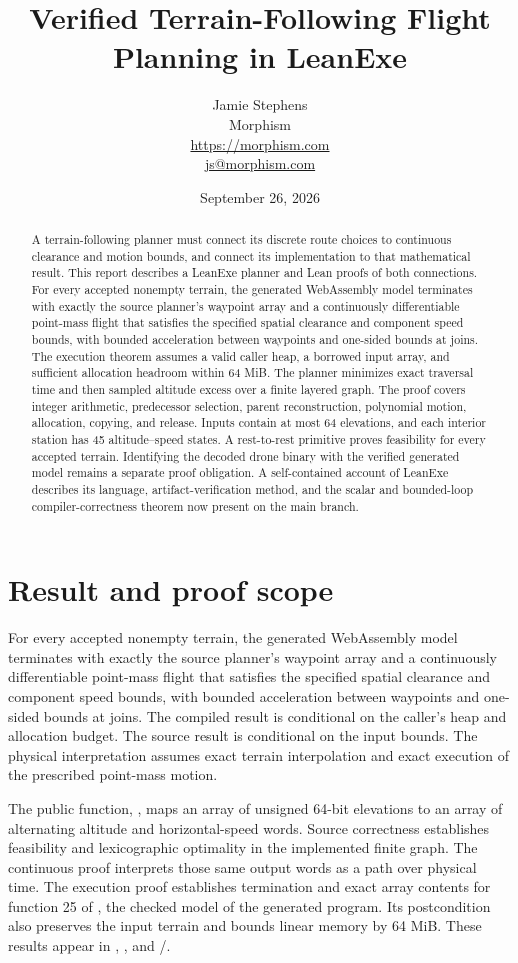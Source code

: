 \documentclass[11pt]{article}
\title{Verified Terrain-Following Flight Planning in LeanExe}
\author{Jamie Stephens\\Morphism\\\url{https://morphism.com}\\\href{mailto:js@morphism.com}{js@morphism.com}}
\date{September 26, 2026}
\begin{document}
\maketitle
\begin{abstract}
A terrain-following planner must connect its discrete route choices to continuous clearance and motion bounds, and connect its implementation to that mathematical result.  This report describes a LeanExe planner and Lean proofs of both connections.  For every accepted nonempty terrain, the generated WebAssembly model terminates with exactly the source planner's waypoint array and a continuously differentiable point-mass flight that satisfies the specified spatial clearance and component speed bounds, with bounded acceleration between waypoints and one-sided bounds at joins.  The execution theorem assumes a valid caller heap, a borrowed input array, and sufficient allocation headroom within 64 MiB.  The planner minimizes exact traversal time and then sampled altitude excess over a finite layered graph.  The proof covers integer arithmetic, predecessor selection, parent reconstruction, polynomial motion, allocation, copying, and release.  Inputs contain at most 64 elevations, and each interior station has 45 altitude--speed states.  A rest-to-rest primitive proves feasibility for every accepted terrain.  Identifying the decoded drone binary with the verified generated model remains a separate proof obligation.  A self-contained account of LeanExe describes its language, artifact-verification method, and the scalar and bounded-loop compiler-correctness theorem now present on the main branch.
\end{abstract}

\section{Result and proof scope}

For every accepted nonempty terrain, the generated WebAssembly model terminates with exactly the source planner's waypoint array and a continuously differentiable point-mass flight that satisfies the specified spatial clearance and component speed bounds, with bounded acceleration between waypoints and one-sided bounds at joins.  The compiled result is conditional on the caller's heap and allocation budget.  The source result is conditional on the input bounds.  The physical interpretation assumes exact terrain interpolation and exact execution of the prescribed point-mass motion.

The public function, , maps an array of unsigned 64-bit elevations to an array of alternating altitude and horizontal-speed words.  Source correctness establishes feasibility and lexicographic optimality in the implemented finite graph.  The continuous proof interprets those same output words as a path over physical time.  The execution proof establishes termination and exact array contents for function 25 of , the checked model of the generated program.  Its postcondition also preserves the input terrain and bounds linear memory by 64 MiB.  These results appear in , , and /.
\end{document}
